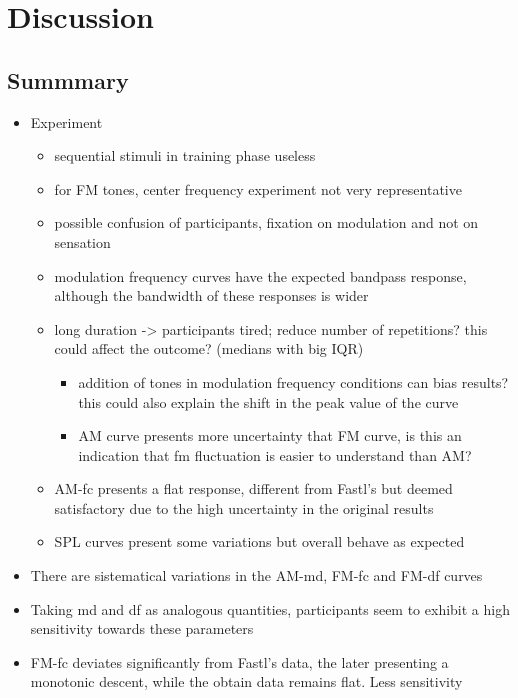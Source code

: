 \documentclass[../main.tex]{subfiles}
\begin{document}
\chapter{Discussion}

\section{Summmary}

\begin{itemize}
  \item Experiment
  \begin{itemize}
    \item sequential stimuli in training phase useless
    \item for FM tones, center frequency experiment not very representative
    \item possible confusion of participants, fixation on modulation and not
      on sensation
    \item modulation frequency curves have the expected bandpass response,
      although the bandwidth of these responses is wider
    \item long duration -> participants tired; reduce number of repetitions?
      this could affect the outcome? (medians with big IQR)
    \begin{itemize}
      \item addition of tones in modulation frequency conditions can bias
        results? this could also explain the shift in the peak value of the
        curve
      \item AM curve presents more uncertainty that FM curve, is this an
        indication that fm fluctuation is easier to understand than AM?
    \end{itemize}
    \item AM-fc presents a flat response, different from Fastl's but deemed
      satisfactory due to the high uncertainty in the original results
    \item SPL curves present some variations but overall behave as expected
   \end{itemize}
    \item There are sistematical variations in the AM-md, FM-fc and FM-df curves
    \item Taking md and df as analogous quantities, participants seem to exhibit
      a high sensitivity towards these parameters
    \item FM-fc deviates significantly from Fastl's data, the later presenting
      a monotonic descent, while the obtain data remains flat. Less sensitivity

\end{itemize}
\end{document}
